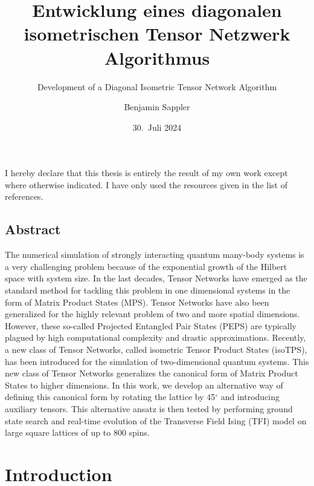 \documentclass[encoding=utf8,british]{template/thesis}
\title{Entwicklung eines diagonalen isometrischen Tensor Netzwerk Algorithmus}
\subtitle{Development of a Diagonal Isometric Tensor Network Algorithm}
\author{Benjamin Sappler}
\date{30.~Juli 2024}
\begin{document}
	\frontmatter
	\maketitle
	
	\newpage
	\thispagestyle{empty}
	
	\null\vfill
	\raggedright\noindent
	I hereby declare that this thesis is entirely the result of my own work except where otherwise indicated. I have only used the resources given in the list of references. \par
	\vspace{2cm}
	\noindent
	\par
	
	\newpage
	\thispagestyle{empty}
	
	\justifying
	
	\section*{Abstract}
	The numerical simulation of strongly interacting quantum many-body systems is a very challenging problem because of the exponential growth of the Hilbert space with system size. In the last decades, Tensor Networks have emerged as the standard method for tackling this problem in one dimensional systems in the form of Matrix Product States (MPS). Tensor Networks have also been generalized for the highly relevant problem of two and more spatial dimensions. However, these so-called Projected Entangled Pair States (PEPS) are typically plagued by high computational complexity and drastic approximations. Recently, a new class of Tensor Networks, called isometric Tensor Product States (isoTPS), has been introduced for the simulation of two-dimensional quantum systems. This new class of Tensor Networks generalizes the canonical form of Matrix Product States to higher dimensions. In this work, we develop an alternative way of defining this canonical form by rotating the lattice by 45$^\circ$ and introducing auxiliary tensors. This alternative ansatz is then tested by performing ground state search and real-time evolution of the Transverse Field Ising (TFI) model on large square lattices of up to 800 spins.
	
	\tableofcontents
	\thispagestyle{empty}
	
	\mainmatter
	
	\chapter{Introduction}
	\label{chap:introduction}
	
	
\end{document}
